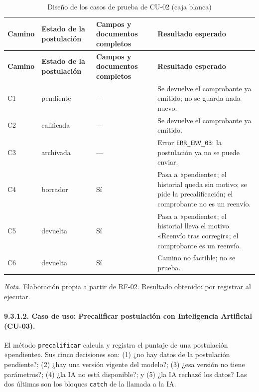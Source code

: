 \begin{longtable}{@{}>{\raggedright\arraybackslash}p{1.4cm}>{\raggedright\arraybackslash}p{2.8cm}>{\raggedright\arraybackslash}p{2.8cm}>{\raggedright\arraybackslash}p{6.0cm}@{}}
\caption{Diseño de los casos de prueba de CU-02 (caja blanca)}\label{tab:dcp_cu02}\\
\toprule
\textbf{Camino} & \textbf{Estado de la postulación} & \textbf{Campos y documentos completos} & \textbf{Resultado esperado} \\
\midrule
\endfirsthead
\toprule
\textbf{Camino} & \textbf{Estado de la postulación} & \textbf{Campos y documentos completos} & \textbf{Resultado esperado} \\
\midrule
\endhead
\bottomrule
\endfoot
C1 & pendiente & --- & Se devuelve el comprobante ya emitido; no se guarda nada nuevo. \\
C2 & calificada & --- & Se devuelve el comprobante ya emitido. \\
C3 & archivada & --- & Error \texttt{ERR\_ENV\_03}: la postulación ya no se puede enviar. \\
C4 & borrador & Sí & Pasa a «pendiente»; el historial queda sin motivo; se pide la precalificación; el comprobante no es un reenvío. \\
C5 & devuelta & Sí & Pasa a «pendiente»; el historial lleva el motivo «Reenvío tras corregir»; el comprobante es un reenvío. \\
C6 & devuelta & Sí & Camino no factible; no se prueba. \\
\end{longtable}
\noindent\textit{Nota.} Elaboración propia a partir de RF-02. Resultado obtenido: por registrar al ejecutar.

\paragraph{9.3.1.2. Caso de uso: Precalificar postulación con Inteligencia Artificial (CU-03).}

El método \texttt{precalificar} calcula y registra el puntaje de una postulación «pendiente». Sus cinco decisiones son: (1) ¿no hay datos de la postulación pendiente?; (2) ¿hay una versión vigente del modelo?; (3) ¿esa versión no tiene parámetros?; (4) ¿la IA no está disponible?; y (5) ¿la IA rechazó los datos? Las dos últimas son los bloques \texttt{catch} de la llamada a la IA.

